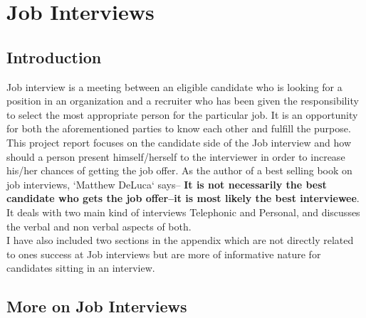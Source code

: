 \documentclass[a4paper,12pt]{report}
\begin{document}
\setcounter{page}{4}
\tableofcontents

\chapter{Job Interviews}             %
\section{Introduction}             %
Job interview  is a meeting between an eligible candidate who is looking for a position in an organization and a recruiter who has been 
given the responsibility to select the most appropriate person for the particular job. It is an opportunity for both the aforementioned 
parties to know each other and fulfill the purpose. \\This project report focuses on the candidate side of the Job interview and how should a person
present himself/herself to the interviewer in order to increase his/her chances of getting the job offer.
As the author of a best selling book on job interviews, `Matthew DeLuca` \cite{matthewluca} says--
{\bf It is not necessarily the best candidate who gets the job offer--it is most likely the best interviewee}. It deals with two
main kind of interviews Telephonic and Personal, and discusses the verbal and non verbal aspects of both.\\
I have also included two sections in the appendix which are not directly related to ones success at Job interviews
but are more of informative nature for candidates sitting in an interview.
\section{More on Job Interviews}       %
\end{document}

